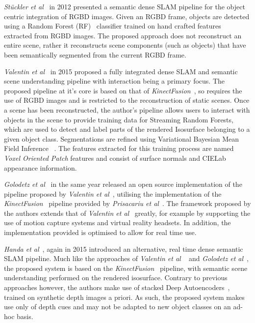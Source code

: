 \textit{St{\"u}ckler et al}~\cite{Stuckler2012} in 2012 presented a semantic dense SLAM 
pipeline for the object centric integration of RGBD images. Given an RGBD frame, objects 
are detected using a Random Forest (RF)~\cite{Ho1995} classifier trained on hand crafted features 
extracted from RGBD images. The proposed approach does not reconstruct an entire scene, rather it 
reconstructs scene components (such as objects) that have been semantically segmented 
from the current RGBD frame.

\textit{Valentin et al}~\cite{Valentin2015} in 2015 proposed a fully integrated dense SLAM 
and semantic scene understanding pipeline with interaction being a primary focus. The 
proposed pipeline at it's core is based on that of \textit{KinectFusion}~\cite{Newcombe2011}, 
so requires the use of RGBD images and is restricted to the reconstruction of static scenes. 
Once a scene has been reconstructed, the author's pipeline allows users to interact with 
objects in the scene to provide training data for Streaming Random Forests\cite{Abdulsalam2007}, 
which are used to detect and label parts of the rendered Isosurface belonging to a given 
object class. Segmentations are refined using Variational Bayesian Mean Field Inference 
~\cite{Xing2002, Krahenbuhl2011}. The features extracted for this training 
process are named \textit{Voxel Oriented Patch} features and consist of surface normals 
and CIELab appearance information.

\textit{Golodetz et al}~\cite{Golodetz2015} in the same year released an open source 
implementation of the pipeline proposed by \textit{Valentin et al}~\cite{Valentin2015}, 
utilising the implementation of the \textit{KinectFusion}~\cite{Newcombe2011} pipeline 
provided by \textit{Prisacariu et al}~\cite{Prisacariu2014}. The framework proposed by 
the authors extends that of \textit{Valentin et al}~\cite{Valentin2015} greatly, for 
example by supporting the use of motion capture systems and virtual reality headsets. 
In addition, the implementation provided is optimised to allow for real time use.

\textit{Handa et al}~\cite{Handa2015}, again in 2015 introduced an alternative, 
real time dense semantic SLAM pipeline. Much like the approaches of \textit{Valentin et al} 
~\cite{Valentin2015} and \textit{Golodetz et al}~\cite{Golodetz2015}, the proposed system 
is based on the \textit{KinectFusion}~\cite{Newcombe2011} pipeline, with semantic scene 
understanding performed on the rendered isosurface. Contrary to previous approaches however, 
the authors make use of stacked Deep Autoencoders~\cite{Liou2008}, trained on synthetic depth 
images a priori. As such, the proposed system makes use only of depth cues and may not be 
adapted to new object classes on an ad-hoc basis.


